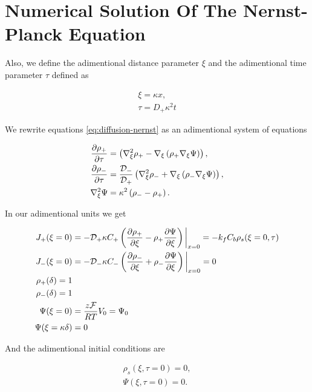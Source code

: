  \section{Numerical Solution Of The Nernst-Planck Equation}
 \label{appendix:nernst-planck-numeric}
 Also, we define the adimentional distance parameter $\xi$ and the adimentional time parameter $\tau$ defined as

\begin{align}
	\xi = \kappa x, \\
	\tau = D_+\kappa^2 t
\end{align}

We rewrite equations \ref{eq:diffusion-nernst} as an adimentional system of equations

\begin{align}
\label{eq:adimetional-diffusion-nernst}
    \frac{\partial \rho_+}{\partial \tau} &= \left({\nabla_\xi^2 \rho_+ - \nabla_\xi\left({\rho_+ \nabla_\xi \Psi}\right)}\right), \\
    \frac{\partial \rho_-}{\partial \tau} &= \frac{\mathcal{D}_-}{\mathcal{D_+}}\left({\nabla_\xi^2 \rho_- + \nabla_\xi\left({\rho_- \nabla_\xi \Psi}\right)}\right), \\
    \nabla_\xi^2 \Psi &= \kappa^2\left({\rho_- - \rho_+}\right).
\end{align}


In our adimentional units we get

\begin{align}
    J_+(\xi = 0) &= -\mathcal{D}_+\kappa C_+\left({\frac{\partial \rho_+}{\partial \xi} - \rho_+ \frac{\partial\Psi}{\partial \xi}}\right)\bigg|_{x= 0}= -k_f C_b\rho_s(\xi = 0, \tau)\\
    J_-(\xi = 0) &= -\mathcal{D}_-\kappa C_-\left({\frac{\partial \rho_-}{\partial \xi} + \rho_- \frac{\partial\Psi}{\partial \xi}}\right)  \bigg|_{x= 0} = 0\\
    \rho_+(\delta) = 1\\
    \rho_-(\delta) = 1\\
    \Psi(\xi = 0) &= \frac{z\mathcal{F}}{RT} V_0 = \Psi_0\\
    \Psi(\xi = \kappa \delta) &= 0
\end{align}

And the adimentional initial conditions are

\begin{align}
	\rho_s(\xi, \tau = 0) = 0,\\
	\Psi (\xi, \tau = 0) = 0.
\end{align}



